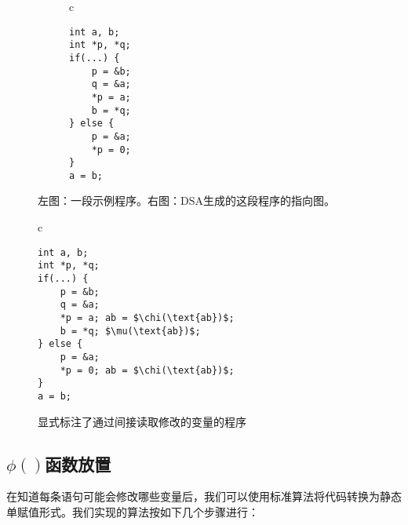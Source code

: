 \begin{figure}
\centering
\begin{subfigure}{0.5\linewidth}
\centering
\begin{tabular}{c}
\begin{lstlisting}
int a, b;
int *p, *q;
if(...) {
    p = &b;
    q = &a;
    *p = a;
    b = *q;
} else {
    p = &a;
    *p = 0;
}
a = b;
\end{lstlisting}
\end{tabular}
\caption{}\label{code:ssa2:l}
\end{subfigure}%
\begin{subfigure}{0.5\linewidth}
\centering
\centering
{}
\caption{}    
\end{subfigure}
\caption{左图：一段示例程序。右图：DSA生成的这段程序的指向图。}
\label{code:ssa2}
\end{figure}

\begin{figure}
\centering
\begin{tabular}{c}
\begin{lstlisting}
int a, b;
int *p, *q;
if(...) {
    p = &b;
    q = &a;
    *p = a; ab = $\chi(\text{ab})$; 
    b = *q; $\mu(\text{ab})$;
} else {
    p = &a;
    *p = 0; ab = $\chi(\text{ab})$;
}
a = b;
\end{lstlisting}
\end{tabular}
\caption{显式标注了通过间接读取修改的变量的程序}\label{code:ssa3}
\end{figure}

\subsection{$\phi()$函数放置}
在知道每条语句可能会修改哪些变量后，我们可以使用标准算法\supercite{aycock2000simple}\supercite{bilardi2003algorithms}\supercite{cytron1995efficiently}\supercite{Cytron:1991}将代码转换为静态单赋值形式。我们实现的算法按如下几个步骤进行：

